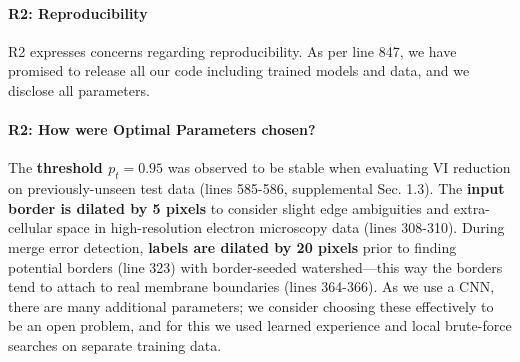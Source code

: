 \documentclass[10pt,twocolumn,letterpaper]{article}
\begin{document}
\begin{table}[h]
\caption{Average proofreading speed for users of Dojo, Focused Proofreading (FP) and our Guided Proofreading (GP). For comparable correction time, our system achieves significantly higher VI reduction per minute (7.5$\times$) over state-of-the-art FP.}%
\label{tab:correctiontimes}
\end{table}

\vspace{-5mm}

\paragraph{R2: Reproducibility}
R2 expresses concerns regarding reproducibility. As per line 847, we have promised to release all our code including trained models and data, and we disclose all parameters.

\vspace{-1mm}

\paragraph{R2: How were Optimal Parameters chosen?}
The \textbf{threshold $p_t=0.95$} was observed to be stable when evaluating VI reduction on previously-unseen test data (lines 585-586, supplemental Sec. 1.3). The \textbf{input border is dilated by 5 pixels} to consider slight edge ambiguities and extra-cellular space in high-resolution electron microscopy data (lines 308-310). During merge error detection, \textbf{labels are dilated by 20 pixels} prior to finding potential borders (line 323) with border-seeded watershed---this way the borders tend to attach to real membrane boundaries (lines 364-366). As we use a CNN, there are many additional parameters; we consider choosing these effectively to be an open problem, and for this we used learned experience and local brute-force searches on separate training data.
\end{document}
